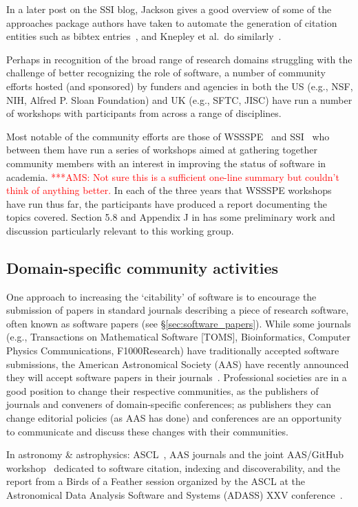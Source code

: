 \documentclass[11pt, oneside]{amsart}
\newcommand{\asnote}[1]{ {\textcolor{red} { ***AMS: #1 }}} %
\begin{document}
In a later post on the SSI blog, Jackson gives a good overview of some of the approaches
package authors have taken to automate the generation of citation entities such as bibtex entries~\cite{ssi-how-shalt-i-cite-thee},
and Knepley et al.\ do similarly~\cite{knepley2013accurately}.

Perhaps in recognition of the broad range of research domains struggling with
the challenge of better recognizing the role of software, a number of community
efforts hosted (and sponsored) by funders and agencies in both the US (e.g., NSF,
NIH, Alfred P. Sloan Foundation) and UK (e.g., SFTC, JISC) have run a number of
workshops with participants from across a range of disciplines.

Most notable of the community efforts are those of WSSSPE~\cite{wssspe} and
SSI~\cite{ssi-workshops} who between them have run a series of workshops aimed
at gathering together community members with an interest in improving the
status of software in academia. \asnote{Not sure this is a sufficient one-line
summary but couldn't think of anything better.} In each of the three years that
WSSSPE workshops have run thus far, the participants have produced a report
documenting the topics covered. Section 5.8 and Appendix J in \cite{WSSSPE3}
has some preliminary work and discussion particularly relevant to this working
group.

\subsection{Domain-specific community activities}

One approach to increasing the `citability' of software is to encourage the
submission of papers in standard journals describing a piece of research
software, often known as software papers (see \S\ref{sec:software_papers}).
While some journals (e.g., Transactions on Mathematical Software [TOMS], Bioinformatics, Computer Physics Communications, F1000Research) have traditionally accepted
software submissions, the American Astronomical Society (AAS) have recently
announced they will accept software papers in their journals~\cite{aas-sofware-papers}. 
Professional societies are in a good position to change their respective communities, as the publishers of journals and conveners of domain-specific conferences; as publishers they can change editorial policies (as AAS has done) and conferences are an opportunity to communicate and discuss these changes with their communities.

In astronomy \& astrophysics: ASCL~\cite{ascl}, AAS journals  and the joint
AAS/GitHub workshop~\cite{aas-software-index} dedicated to software citation,
indexing and discoverability, and the report from a Birds of a Feather session
organized by the ASCL at the Astronomical Data Analysis Software and Systems
(ADASS) XXV conference~\cite{2015arXiv151207919A}.
\end{document}
